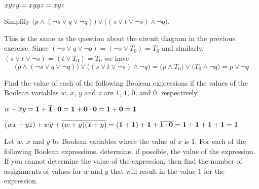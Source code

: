 \documentclass[a4paper, english, 12pt]{article} %
\begin{document}
\begin{subsubproblem}
    $xyzy \ans{= xyyz = xyz}$
\end{subsubproblem}

\begin{problem}[7]
  Simplify $\bigl( p \wedge (\neg s \vee q \vee \neg q) \bigr) \vee \bigl( (s
  \vee t \vee \neg s) \wedge \neg q \bigr)$.
\end{problem}

\begin{answer}
  This is the same as the question about the circuit diagram in the previous
  exercise. Since $(\neg s \vee q \vee \neg q) = (\neg s \vee T_0) = T_0$
  and similarly, $(s \vee t \vee \neg s) = (t \vee T_0) = T_0$ we have
  \begin{equation*}
    \bigl( p \wedge (\neg s \vee q \vee \neg q) \bigr) \vee \bigl( (s
    \vee t \vee \neg s) \wedge \neg q \bigr)
    = \bigl( p \wedge T_0 \bigr) \vee \bigl( T_0 \wedge \neg q \bigr)
    = p \vee \neg q
  \end{equation*}
\end{answer}


\begin{problem}[1]
  Find the value of each of the following Boolean expressions if the values of
  the Boolean variables $w$, $x$, $y$ and $z$ are $1$, $1$, $0$, and $0$,
  respectively.
\end{problem}

\begin{subproblem}[2]
  $w + \overline{x}y = \ans{\1 + \overline{\1} \cdot \0 = \1 + \0 \cdot \0 = \1 + \0 = \1 } $
\end{subproblem} 

\begin{subproblem}[4]
  $(wx + y \overline{z}) + w \overline{y} + \overline{(w+y)(\overline{x}+y)} =
  (\textbf{1} + \textbf{1}) + \textbf{1} + \overline{\textbf{1} \cdot \textbf{0}} = \textbf{1} + \textbf{1} + \textbf{1} + \textbf{1} = \textbf{1}$
\end{subproblem} 

\begin{problem}
  Let $w$, $x$ and $y$ be Boolean variables where the value of $x$ is $1$. For
  each of the following Boolean expressions, determine, if possible, the value
  of the expression. If you cannot determine the value of the expression, then
  find the number of assignments of values for $w$ and $y$ that will result in
  the value $1$ for the expression. 
\end{problem}
\end{document}
